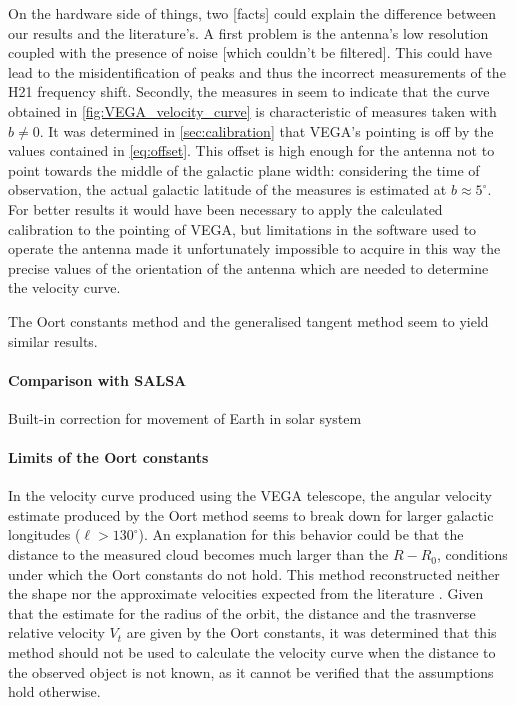 On the hardware side of things, two [facts] could explain the difference between our results and the literature's. 
A first problem is the antenna's low resolution coupled with the presence of noise [which couldn't be filtered]. This could have lead to the misidentification of peaks and thus the incorrect measurements of the H21 frequency shift. 
Secondly, the measures in \cite{sakhawat_hossain_salsa_2018} seem to indicate that the curve obtained in \autoref{fig:VEGA_velocity_curve} is characteristic of measures taken with $b \neq 0$. 
It was determined in \autoref{sec:calibration} that VEGA's pointing is off by the values contained in \autoref{eq:offset}.
This offset is high enough for the antenna not to point towards the middle of the galactic plane width: considering the time of observation, the actual galactic latitude of the measures is estimated at $b \approx 5^{\circ}$.
For better results it would have been necessary to apply the calculated calibration to the pointing of VEGA, but limitations in the software used to operate the antenna made it unfortunately impossible to acquire in this way the precise values of the orientation of the antenna which are needed to determine the velocity curve.

The Oort constants method and the generalised tangent method seem to yield similar results.

\paragraph{Comparison with SALSA}
Built-in correction for movement of Earth in solar system

\paragraph{Limits of the Oort constants}
In the velocity curve produced using the VEGA telescope, the angular velocity estimate produced by the Oort method seems to break down for larger galactic longitudes ($\ell > 130^\circ$). An explanation for this behavior could be that the distance to the measured cloud becomes much larger than the $R-R_0$, conditions under which the Oort constants do not hold.
This method reconstructed neither the shape nor the approximate velocities expected from the literature \cite{mroz_rotation_2019}.
Given that the estimate for the radius of the orbit, the distance and the trasnverse relative velocity $V_t$ are given by the Oort constants, it was determined that this method should not be used to calculate the velocity curve when the distance to the observed object is not known, as it cannot be verified that the assumptions hold otherwise.

